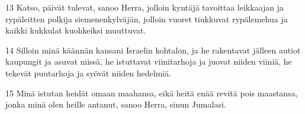 \par 13 Katso, päivät tulevat, sanoo Herra, jolloin kyntäjä tavoittaa leikkaajan ja rypäleitten polkija siemenenkylväjän, jolloin vuoret tiukkuvat rypälemehua ja kaikki kukkulat kuohkeiksi muuttuvat.
\par 14 Silloin minä käännän kansani Israelin kohtalon, ja he rakentavat jälleen autiot kaupungit ja asuvat niissä, he istuttavat viinitarhoja ja juovat niiden viiniä, he tekevät puutarhoja ja syövät niiden hedelmiä.
\par 15 Minä istutan heidät omaan maahansa, eikä heitä enää revitä pois maastansa, jonka minä olen heille antanut, sanoo Herra, sinun Jumalasi.


